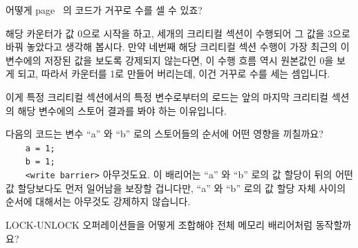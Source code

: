 \begin{enumerate}
\QuickQ{}
	어떻게 page~\pageref{codesample:advsync:What Can You Count On? 2} 의
	코드가 거꾸로 수를 셀 수 있죠?

\QuickA{}
	해당 카운터가 값 0으로 시작을 하고, 세개의 크리티컬 섹션이 수행되어 그
	값을 3으로 바꿔 놓았다고 생각해 봅시다.
	만약 네번째 해당 크리티컬 섹션 수행이 가장 최근의 이 변수에의 저장된
	값을 보도록 강제되지 않는다면, 이 수행 흐름 역시 원본값인 0을 보게
	되고, 따라서 카운터를 1로 만들어 버리는데, 이건 거꾸로 수를 세는
	셈입니다.

	이게 특정 크리티컬 섹션에서의 특정 변수로부터의 로드는 앞의 마지막
	크리티컬 섹션의 해당 변수에의 스토어 결과를 봐야 하는 이유입니다.

\QuickQ{}
	다음의 코드는 변수 ``a'' 와 ``b'' 로의 스토어들의 순서에 어떤 영향을
	끼칠까요? \\

	{\tt ~~~~a = 1;} \\
	{\tt ~~~~b = 1;} \\
	{\tt ~~~~<write barrier>}
\QuickA{}
	아무것도요.
	이 배리어는 ``a'' 와 ``b'' 로의 값 할당이 뒤의 어떤 값 할당보다도 먼저
	일어남을 보장할 겁니다만, ``a'' 와 ``b'' 로의 값 할당 자체 사이의
	순서에 대해서는 아무것도 강제하지 않습니다.

\QuickQ{}
	LOCK-UNLOCK 오퍼레이션들을 어떻게 조합해야 전체 메모리 배리어처럼
	동작할까요?
	\iffalse


\end{enumerate}
